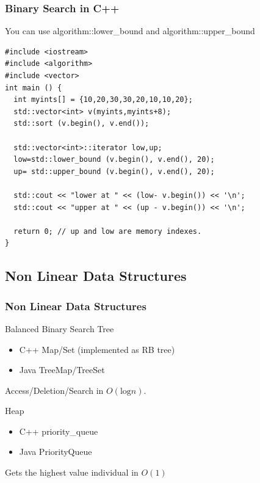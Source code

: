 \documentclass{beamer}
\begin{document}
\begin{frame}
  \frametitle{Binary Search in C++}
  
  {\small You can use algorithm::lower\_bound and algorithm::upper\_bound
  
 
  \begin{block}{}
\begin{verbatim} 
#include <iostream>     
#include <algorithm>    
#include <vector>       
int main () {
  int myints[] = {10,20,30,30,20,10,10,20};
  std::vector<int> v(myints,myints+8);           
  std::sort (v.begin(), v.end());                

  std::vector<int>::iterator low,up;
  low=std::lower_bound (v.begin(), v.end(), 20); 
  up= std::upper_bound (v.begin(), v.end(), 20); 

  std::cout << "lower at " << (low- v.begin()) << '\n';
  std::cout << "upper at " << (up - v.begin()) << '\n';

  return 0; // up and low are memory indexes.
}
\end{verbatim}
    \end{block}
}

\end{frame}


\subsection{Non Linear Data Structures}
\begin{frame}
  \frametitle{Non Linear Data Structures}

  \begin{block}{Balanced Binary Search Tree}
    \begin{itemize}
    \item C++ Map/Set (implemented as RB tree)
    \item Java TreeMap/TreeSet
    \end{itemize}
    Access/Deletion/Search in $O(\text{log}n)$.
  \end{block}

  \begin{block}{Heap}
    \begin{itemize}
      \item C++ priority\_queue
      \item Java PriorityQueue
    \end{itemize}
    Gets the highest value individual in $O(1)$
  \end{block}
\end{frame}
\end{document}
